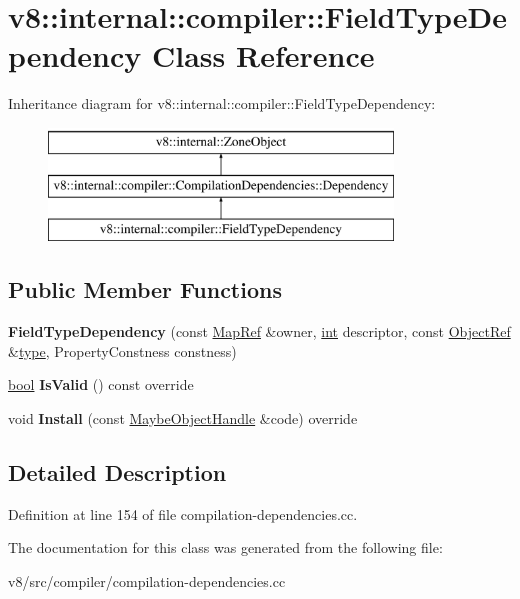 \hypertarget{classv8_1_1internal_1_1compiler_1_1FieldTypeDependency}{}\section{v8\+:\+:internal\+:\+:compiler\+:\+:Field\+Type\+Dependency Class Reference}
\label{classv8_1_1internal_1_1compiler_1_1FieldTypeDependency}
Inheritance diagram for v8\+:\+:internal\+:\+:compiler\+:\+:Field\+Type\+Dependency\+:\begin{figure}[H]
\begin{center}
\leavevmode
\includegraphics[height=3.000000cm]{classv8_1_1internal_1_1compiler_1_1FieldTypeDependency}
\end{center}
\end{figure}
\subsection*{Public Member Functions}
\begin{DoxyCompactItemize}
\item 
\mbox{\label{classv8_1_1internal_1_1compiler_1_1FieldTypeDependency_adc054b5eaa42ff9ef400b41913ab14c3}} 
{\bfseries Field\+Type\+Dependency} (const \mbox{\hyperlink{classv8_1_1internal_1_1compiler_1_1MapRef}{Map\+Ref}} \&owner, \mbox{\hyperlink{classint}{int}} descriptor, const \mbox{\hyperlink{classv8_1_1internal_1_1compiler_1_1ObjectRef}{Object\+Ref}} \&\mbox{\hyperlink{classstd_1_1conditional_1_1type}{type}}, Property\+Constness constness)
\item 
\mbox{\label{classv8_1_1internal_1_1compiler_1_1FieldTypeDependency_ab90bf288214dec737379712da1887612}} 
\mbox{\hyperlink{classbool}{bool}} {\bfseries Is\+Valid} () const override
\item 
\mbox{\label{classv8_1_1internal_1_1compiler_1_1FieldTypeDependency_aace09303d715cbcb9a07089b1d655857}} 
void {\bfseries Install} (const \mbox{\hyperlink{classv8_1_1internal_1_1MaybeObjectHandle}{Maybe\+Object\+Handle}} \&code) override
\end{DoxyCompactItemize}


\subsection{Detailed Description}


Definition at line 154 of file compilation-\/dependencies.\+cc.



The documentation for this class was generated from the following file\+:\begin{DoxyCompactItemize}
\item 
v8/src/compiler/compilation-\/dependencies.\+cc\end{DoxyCompactItemize}
